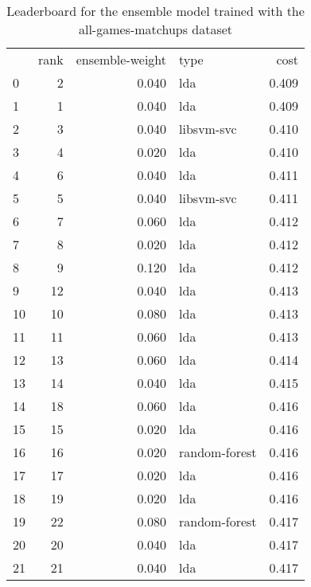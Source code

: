 \begin{table}[]
	\centering
	\begin{tabular}{lrrlr}
		   & rank & ensemble-weight & type          & cost  \\
		0  & 2    & 0.040           & lda           & 0.409 \\
		1  & 1    & 0.040           & lda           & 0.409 \\
		2  & 3    & 0.040           & libsvm-svc    & 0.410 \\
		3  & 4    & 0.020           & lda           & 0.410 \\
		4  & 6    & 0.040           & lda           & 0.411 \\
		5  & 5    & 0.040           & libsvm-svc    & 0.411 \\
		6  & 7    & 0.060           & lda           & 0.412 \\
		7  & 8    & 0.020           & lda           & 0.412 \\
		8  & 9    & 0.120           & lda           & 0.412 \\
		9  & 12   & 0.040           & lda           & 0.413 \\
		10 & 10   & 0.080           & lda           & 0.413 \\
		11 & 11   & 0.060           & lda           & 0.413 \\
		12 & 13   & 0.060           & lda           & 0.414 \\
		13 & 14   & 0.040           & lda           & 0.415 \\
		14 & 18   & 0.060           & lda           & 0.416 \\
		15 & 15   & 0.020           & lda           & 0.416 \\
		16 & 16   & 0.020           & random-forest & 0.416 \\
		17 & 17   & 0.020           & lda           & 0.416 \\
		18 & 19   & 0.020           & lda           & 0.416 \\
		19 & 22   & 0.080           & random-forest & 0.417 \\
		20 & 20   & 0.040           & lda           & 0.417 \\
		21 & 21   & 0.040           & lda           & 0.417 \\
	\end{tabular}

	\caption{Leaderboard for the ensemble model trained with the all-games-matchups dataset}
	\label{tab:lb-all-games-matchups}
\end{table}

